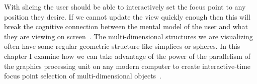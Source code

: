 
With slicing the user should be able to interactively set the focus point to
any position they desire. If we cannot update the view quickly enough then this
will break the cognitive connection between the mental model of the user and
what they are viewing on screen~\cite{Shneiderman:1987}. The multi-dimensional
structures we are visualizing often have some regular geometric structure like
simplices or spheres.  In this chapter I examine how we can take advantage of
the power of the parallelism of the graphics processing unit on any modern
computer to create interactive-time focus point selection of multi-dimensional
objects~\cite{Torsney-Weir:2017}.











